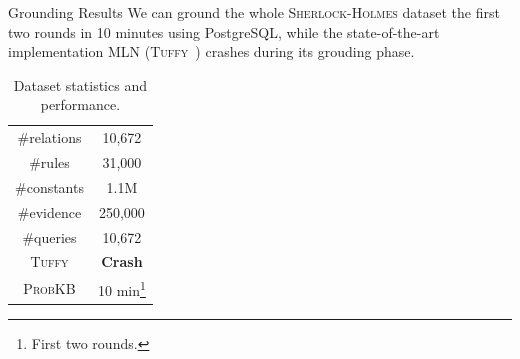 \documentclass[onlymath,xcolor=pdftex,dvipsnames,table]{beamer}
\newcommand{\probkb}{\textsc{ProbKB}\xspace}
\newcommand{\sherlock}{\textsc{Sherlock}\xspace}
\newcommand{\holmes}{\textsc{Holmes}\xspace}
\newcommand{\tuffy}{\textsc{Tuffy}\xspace}
\let\oldemph\emph
\renewcommand{\emph}[1]{{\color{Blue}\oldemph{#1}}}
\newcommand{\head}[1]{{\large\color{OliveGreen}#1\\[2pt]}}
\begin{document}
\begin{frame}{Grounding Results}
We can ground the whole \sherlock-\holmes dataset the first two rounds in 10 minutes using PostgreSQL, while the state-of-the-art implementation MLN (\tuffy~\cite{DBLP:journals/pvldb/NiuRDS11}) crashes during its grouding phase.
\begin{table}
  \centering
  \begin{tabular}{|c|c|}\hline
   \#relations & 10,672 \\
   \#rules     & 31,000 \\
   \#constants & 1.1M \\
   \#evidence  & 250,000 \\
   \#queries   & 10,672 \\
   \tuffy      & \textbf{\color{Red}Crash} \\
   \probkb     & 10 min\footnote{First two rounds.} \\
   \hline
  \end{tabular}
  \caption{Dataset statistics and performance.}
\end{table}
\end{frame}



\end{document}
